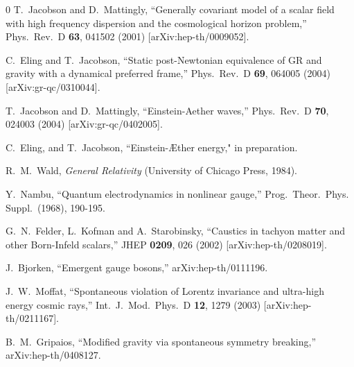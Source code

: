 \documentclass[aps]{ws-procs9x6}
\begin{document}
\begin{thebibliography}{0}
T.~Jacobson and D.~Mattingly,
``Generally covariant model of a scalar field with high frequency  dispersion
and the cosmological horizon problem,''
Phys.\ Rev.\ D {\bf 63}, 041502 (2001)
[arXiv:hep-th/0009052].

C.~Eling and T.~Jacobson,
``Static post-Newtonian equivalence of GR and gravity with a dynamical
preferred frame,''
Phys.\ Rev.\ D {\bf 69}, 064005 (2004)
[arXiv:gr-qc/0310044].

T.~Jacobson and D.~Mattingly,
``Einstein-Aether waves,''
Phys.\ Rev.\ D {\bf 70}, 024003 (2004)
[arXiv:gr-qc/0402005].

C.~Eling, and T.~Jacobson, ``Einstein-{\AE}ther energy," in
preparation.

R.~M.~Wald, {\it General Relativity}
(University of Chicago Press, 1984).

Y.~Nambu,
``Quantum electrodynamics in nonlinear gauge,''
Prog.\ Theor.\ Phys.\, Suppl.\ (1968), 190-195.

G.~N.~Felder, L.~Kofman and A.~Starobinsky,
``Caustics in tachyon matter and other Born-Infeld scalars,''
JHEP {\bf 0209}, 026 (2002)
[arXiv:hep-th/0208019].

J.~Bjorken,
``Emergent gauge bosons,''
arXiv:hep-th/0111196.

J.~W.~Moffat,
``Spontaneous violation of Lorentz invariance and ultra-high energy cosmic
rays,''
Int.\ J.\ Mod.\ Phys.\ D {\bf 12}, 1279 (2003)
[arXiv:hep-th/0211167].

B.~M.~Gripaios,
``Modified gravity via spontaneous symmetry breaking,''
arXiv:hep-th/0408127.


\end{thebibliography}
\end{document}

